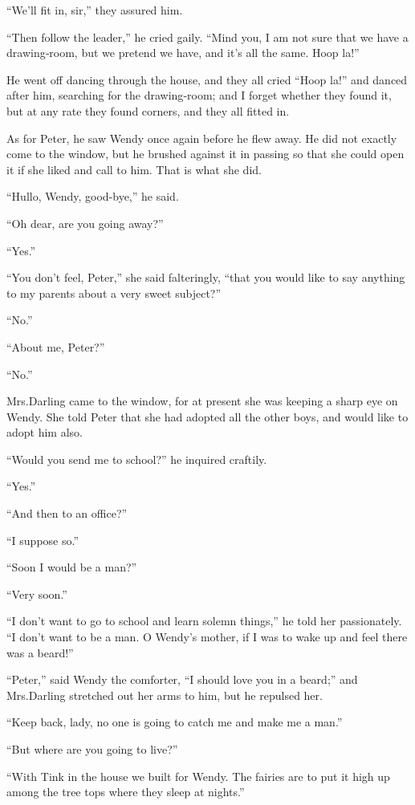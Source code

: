 “We’ll fit in, sir,” they assured him.

“Then follow the leader,” he cried gaily.
“Mind you, I am not sure that we have a drawing‐room,
but we pretend we have, and it’s all the same.
Hoop la!”

He went off dancing through the house,
and they all cried “Hoop la!\@” and danced after him,
searching for the drawing‐room;
and I forget whether they found it,
but at any rate they found corners, and they all fitted in.

As for Peter, he saw Wendy once again before he flew away.
He did not exactly come to the window,
but he brushed against it in passing so that she could open it if she liked and call to him.
That is what she did.

“Hullo, Wendy, good‐bye,” he said.

“Oh dear, are you going away?”

“Yes.”

“You don’t feel, Peter,” she said falteringly,
“that you would like to say anything to my parents about a very sweet subject?”

“No.”

“About me, Peter?”

“No.”

Mrs.\@ Darling came to the window,
for at present she was keeping a sharp eye on Wendy.
She told Peter that she had adopted all the other boys,
and would like to adopt him also.

“Would you send me to school?\@” he inquired craftily.

“Yes.”

“And then to an office?”

“I suppose so.”

“Soon I would be a man?”

“Very soon.”

“I don’t want to go to school and learn solemn things,”
he told her passionately.
“I don’t want to be a man.
O Wendy’s mother, if I was to wake up and feel there was a beard!”

“Peter,” said Wendy the comforter, “I should love you in a beard;”
and Mrs.\@ Darling stretched out her arms to him, but he repulsed her.

“Keep back, lady, no one is going to catch me and make me a man.”

“But where are you going to live?”

“With Tink in the house we built for Wendy.
The fairies are to put it high up among the tree tops where they sleep at nights.”

